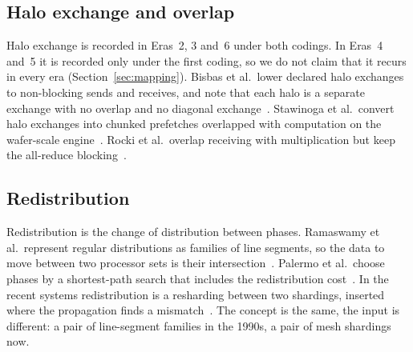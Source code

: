 \subsection{Halo exchange and overlap}
Halo exchange is recorded in Eras~2, 3 and~6 under both codings. In Eras~4 and~5 it is recorded only under the first coding, so we do not claim that it recurs in every era (Section~\ref{sec:mapping}). Bisbas et al.\ lower declared halo exchanges to non-blocking sends and receives, and note that each halo is a separate exchange with no overlap and no diagonal exchange~\cite{bisbas2024shared}. Stawinoga et al.\ convert halo exchanges into chunked prefetches overlapped with computation on the wafer-scale engine~\cite{stawinoga2026mlir}. Rocki et al.\ overlap receiving with multiplication but keep the all-reduce blocking~\cite{rocki2020cerebras}.

\subsection{Redistribution}
Redistribution is the change of distribution between phases. Ramaswamy et al.\ represent regular distributions as families of line segments, so the data to move between two processor sets is their intersection~\cite{ramaswamy1996redistribution}. Palermo et al.\ choose phases by a shortest-path search that includes the redistribution cost~\cite{palermo1996dynamic}. In the recent systems redistribution is a resharding between two shardings, inserted where the propagation finds a mismatch~\cite{xu2021gspmd,alabed2025partir}. The concept is the same, the input is different: a pair of line-segment families in the 1990s, a pair of mesh shardings now.
